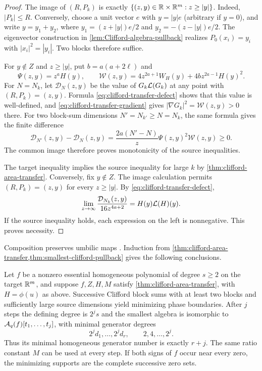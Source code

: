 \begin{proof}
The image of $(R,P_k)$ is exactly \(\{(z,y)\in\mathbb R\times\mathbb R^m:z\ge|y|\}\).
Indeed, $|P_k|\le R$. Conversely, choose a unit vector $e$ with
$y=|y|e$ (arbitrary if $y=0$), and write
$y=y_1+y_2$, where
$y_1=(z+|y|)e/2$ and $y_2=-(z-|y|)e/2$.
The eigenvector construction in
\cref{lem:Clifford-algebra-pullback} realizes $P_0(x_i)=y_i$
with $|x_i|^2=|y_i|$. Two blocks therefore suffice.

For $y\notin Z$ and $z\ge|y|$, put $b=a(a+2\ell)$ and
\[
 \Psi(z,y)=z^aH(y),\qquad
 \mathcal W(z,y)=4z^{2a+1}W_H(y)+4bz^{2a-1}H(y)^2.
\]
For $N=N_k$, let $\mathcal D_N(z,y)$ be the value of
$G_k\mathcal L(G_k)$ at any point with $(R,P_k)=(z,y)$.
Formula \eqref{eq:clifford-transfer-defect} shows that this value
is well-defined, and \eqref{eq:clifford-transfer-gradient} gives
$|\nabla G_k|^2=\mathcal W(z,y)>0$ there.
For two block-sum dimensions $N'=N_{k'}\ge N=N_k$, the same
formula gives the finite difference
\begin{equation}\label{eq:clifford-dimension-monotonicity}
 \mathcal D_{N'}(z,y)-\mathcal D_N(z,y)
 =\frac{2a(N'-N)}{z}\Psi(z,y)^2\mathcal W(z,y)\ge0.
\end{equation}
The common image therefore proves monotonicity of the source
inequalities.

The target inequality implies the source inequality for large $k$
by \cref{thm:clifford-area-transfer}. Conversely, fix $y\notin Z$.
The image calculation permits $(R,P_k)=(z,y)$ for every $z\ge|y|$.
By \eqref{eq:clifford-transfer-defect},
\[
 \lim_{z\to\infty}
 \frac{\mathcal D_{N_k}(z,y)}{16z^{4a+2}}
     =H(y)\mathcal L(H)(y).
\]
If the source inequality holds, each expression on the left is
nonnegative. This proves necessity.
\end{proof}

Composition preserves umbilic maps
\cite[Proposition~5.1.8(1)]{RiedlerThesis25}. Induction from
\cref{thm:clifford-area-transfer,thm:smallest-clifford-pullback}
gives the following conclusions.

\begin{corollary}[Iteration]
\label{cor:iterated-clifford-transfer}
Let $f$ be a nonzero essential homogeneous polynomial of degree
$s\ge2$ on the target $\mathbb R^m$, and suppose $f,Z,H,M$ satisfy
\cref{thm:clifford-area-transfer}, with $H=\phi(u)$ as above.
Successive Clifford block sums with at least two blocks and
sufficiently large source dimensions yield minimizing phase boundaries.
After $j$ steps the defining degree is $2^js$ and the smallest algebra
is isomorphic to $\mathcal A_q(f)[t_1,\ldots,t_j]$, with minimal generator
degrees
\[
 2^jd_1,\ldots,2^jd_r,\qquad 2,4,\ldots,2^j.
\]
Thus its minimal homogeneous generator number is exactly $r+j$.
The same ratio constant $M$ can be used at every step. If both signs
of $f$ occur near every zero, the minimizing supports are the complete
successive zero sets.
\end{corollary}

